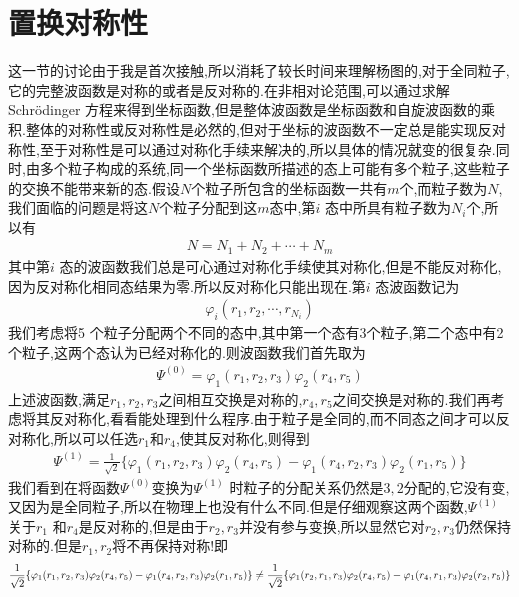 \section{置换对称性}

这一节的讨论由于我是首次接触,所以消耗了较长时间来理解杨图的,对于全同粒子,它的完整波函数是对称的或者是反对称的.在非相对论范围,可以通过求解Schr\"odinger 方程来得到坐标函数,但是整体波函数是坐标函数和自旋波函数的乘积.整体的对称性或反对称性是必然的,但对于坐标的波函数不一定总是能实现反对称性,至于对称性是可以通过对称化手续来解决的,所以具体的情况就变的很复杂.同时,由多个粒子构成的系统,同一个坐标函数所描述的态上可能有多个粒子,这些粒子的交换不能带来新的态.假设$N$个粒子所包含的坐标函数一共有$m$个,而粒子数为$N$,我们面临的问题是将这$N$个粒子分配到这$m$态中,第$i$ 态中所具有粒子数为$N_i$个,所以有
\begin{gather}
  N=N_1+N_2+\cdots +N_m
\end{gather}
其中第$i$ 态的波函数我们总是可心通过对称化手续使其对称化,但是不能反对称化,因为反对称化相同态结果为零.所以反对称化只能出现在.第$i$ 态波函数记为
\begin{gather}
  \varphi_i(r_1,r_2,\cdots,r_{N_i})
\end{gather}
我们考虑将5 个粒子分配两个不同的态中,其中第一个态有3个粒子,第二个态中有2个粒子,这两个态认为已经对称化的.则波函数我们首先取为
\begin{gather}
  \Psi^{(0)}=\varphi_1(r_1,r_2,r_3)\varphi_2(r_4,r_5) 
\end{gather}
上述波函数,满足$r_1,r_2,r_3$之间相互交换是对称的,$r_4,r_5$之间交换是对称的.我们再考虑将其反对称化,看看能处理到什么程序.由于粒子是全同的,而不同态之间才可以反对称化,所以可以任选$r_1$和$r_4$,使其反对称化,则得到
\begin{gather}
  \Psi^{(1)}=\frac{1}{\sqrt{2}}
  \{
    \varphi_1(r_1,r_2,r_3)\varphi_2(r_4,r_5) 
    -\varphi_1(r_4,r_2,r_3)\varphi_2(r_1,r_5) 
  \}
\end{gather}
我们看到在将函数$\Psi^{(0)}$变换为$\Psi^{(1)}$ 时粒子的分配关系仍然是$3,2$分配的,它没有变,又因为是全同粒子,所以在物理上也没有什么不同.但是仔细观察这两个函数,$\Psi^{(1)}$ 关于$r_1$ 和$r_4$是反对称的,但是由于$r_2,r_3$并没有参与变换,所以显然它对$r_2,r_3$仍然保持对称的.但是$r_1,r_2$将不再保持对称!即 
\begin{gather}
  \frac{1}{\sqrt{2}}
  \{
    \varphi_1(r_1,r_2,r_3)\varphi_2(r_4,r_5) 
    -\varphi_1(r_4,r_2,r_3)\varphi_2(r_1,r_5) 
  \}
  \neq
  \frac{1}{\sqrt{2}}
  \{
    \varphi_1(r_2,r_1,r_3)\varphi_2(r_4,r_5) 
    -\varphi_1(r_4,r_1,r_3)\varphi_2(r_2,r_5) 
  \}\notag
\end{gather}
